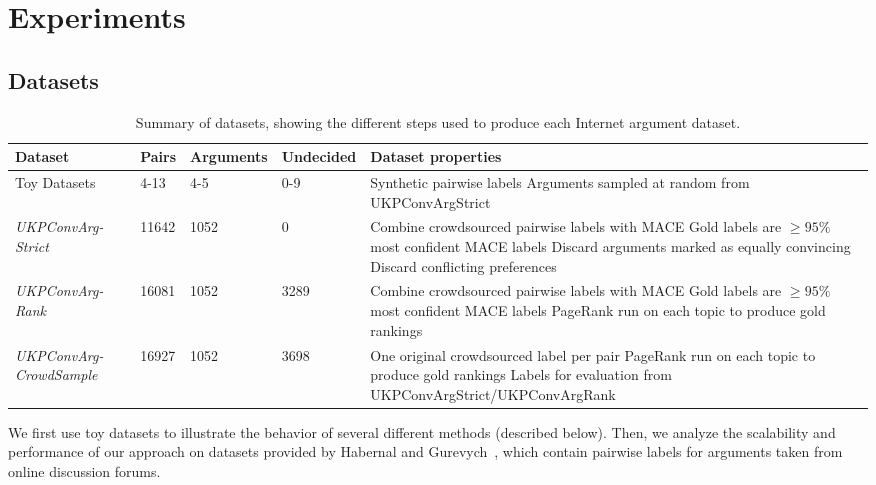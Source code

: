 \section{Experiments}\label{sec:expts}

\subsection{Datasets}
\begin{table}[h]
\small
  \begin{tabularx}{\textwidth}{ p{2.0cm} | p{0.6cm} p{1.2cm} p{1.2cm} X }
  Dataset & Pairs & Arguments & Undecided & Dataset properties \\\hline\hline
  Toy Datasets & 4-13 & 4-5 & 0-9 & Synthetic pairwise labels
  \newline Arguments sampled at random from UKPConvArgStrict\\  
  \hline\emph{UKPConvArg-Strict} &
  11642 &
  1052 & 
  0 &
  Combine crowdsourced pairwise labels with MACE \newline
  Gold labels are $\ge 95\%$ most confident MACE labels \newline
  Discard arguments marked as equally convincing \newline
  Discard conflicting preferences \\
  \hline\emph{UKPConvArg-Rank} &
  16081 &
  1052 &
  3289 &
  Combine crowdsourced pairwise labels with MACE \newline
  Gold labels are $\ge 95\%$ most confident MACE labels \newline
  PageRank run on each topic to produce gold rankings \\  
  \hline\emph{UKPConvArg-CrowdSample} &
  16927 & 
  1052 &
  3698 &
  One original crowdsourced label per pair\newline
  PageRank run on each topic to produce gold rankings \newline
  Labels for evaluation from UKPConvArgStrict/UKPConvArgRank
  \end{tabularx}
  \caption{\label{tab:expt_data} Summary of datasets, showing the different steps used to produce each Internet argument dataset.}
\end{table}
We first use toy datasets to illustrate the behavior of several different methods (described below).
Then, 
we analyze the scalability and performance of our approach on datasets provided by Habernal and Gurevych~,
which contain pairwise labels for arguments taken from online discussion forums.
